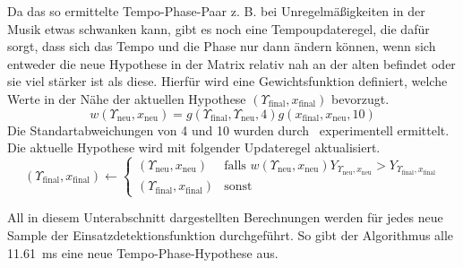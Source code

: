 {{{			%
			Da das so ermittelte Tempo-Phase-Paar  z. B. bei Unregelmä{\ss}igkeiten in der Musik etwas schwanken kann,
				gibt es noch eine Tempoupdateregel,
				die dafür sorgt,
				dass sich das Tempo und die Phase nur dann ändern können,
				wenn sich entweder die neue Hypothese in der Matrix relativ nah an der alten befindet
				oder sie viel stärker ist als diese.
			Hierfür wird eine Gewichtsfunktion definiert,
				welche Werte in der Nähe der aktuellen Hypothese $(\Upsilon_\text{final}, x_\text{final})$ bevorzugt.
			\begin{equation}
				w(\Upsilon_{\text{neu}}, x_{\text{neu}}) =
					g(\Upsilon_\text{final}, \Upsilon_{\text{neu}}, 4)
					g(x_\text{final}, x_{\text{neu}}, 10)
			\end{equation}
			Die Standartabweichungen von \num{4} und \num{10} wurden durch~\cite{2011_PlRoSt} experimentell ermittelt.
			Die aktuelle Hypothese wird mit folgender Updateregel aktualisiert.
			\begin{equation}
				(\Upsilon_\text{final}, x_\text{final}) \leftarrow
				\begin{cases}
					(\Upsilon_{\text{neu}}, x_{\text{neu}}) &
						\text{falls } w(\Upsilon_{\text{neu}}, x_{\text{neu}}) Y_{\Upsilon_{\text{neu}}, x_{\text{neu}}} >
							Y_{\Upsilon_\text{final}, x_\text{final}} \\
					(\Upsilon_\text{final}, x_\text{final}) &
						\text{sonst}
				\end{cases}
			\end{equation}

			All in diesem Unterabschnitt dargestellten Berechnungen werden für jedes neue Sample der Einsatzdetektionsfunktion durchgeführt.
			So gibt der Algorithmus alle \SI{11.61}{\milli\second} eine neue Tempo-Phase-Hypothese aus.
		}
	}
}
